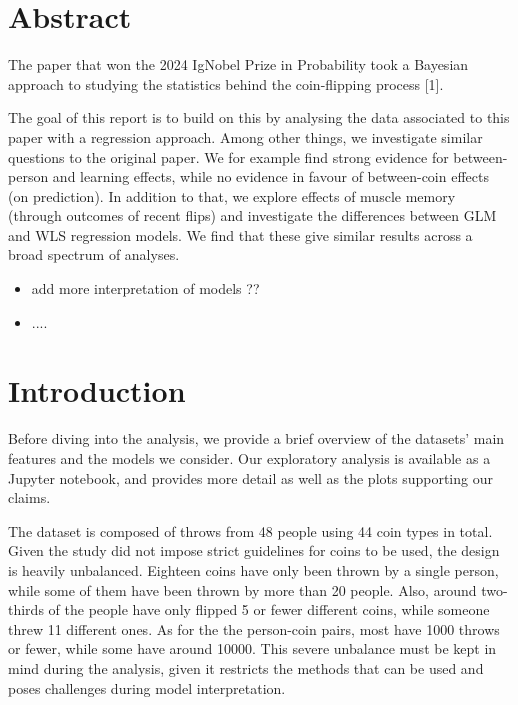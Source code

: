 \documentclass[a4paper, 12pt,oneside]{article}
\begin{document}
 
	 
	\clearpage
	\tableofcontents
	\thispagestyle{empty}
	\vspace{2cm}
	\section*{Abstract}
		The paper that won the 2024 IgNobel Prize in Probability took a Bayesian approach to studying the statistics behind the coin-flipping process [1]. 

		The goal of this report is to build on this by analysing the data associated to this paper with a regression approach. Among other things, we investigate similar questions to the original paper. We for example find strong evidence for between-person and learning effects, while no evidence in favour of between-coin effects (on prediction). In addition to that, we explore effects of muscle memory (through outcomes of recent flips) and investigate the differences between GLM and WLS regression models. We find that these give similar results across a broad spectrum of analyses. 
		\begin{itemize}
			\item add more interpretation of models ?? 
			\item ....
		\end{itemize}
	\clearpage
	\setcounter{page}{1}
	\section{Introduction}
		Before diving into the analysis, we provide a brief overview of the datasets' main features and the models we consider. Our exploratory analysis is available as a Jupyter notebook, and provides more detail as well as the plots supporting our claims.

		The dataset is composed of throws from 48 people using 44 coin types in total. Given the study did not impose strict guidelines for coins to be used, the design is heavily unbalanced. Eighteen coins have only been thrown by a single person, while some of them have been thrown by more than 20 people. Also, around two-thirds of the people have only flipped 5 or fewer different coins, while someone threw 11 different ones. As for the the person-coin pairs, most have 1000 throws or fewer, while some have around 10000. This severe unbalance must be kept in mind during the analysis, given it restricts the methods that can be used and poses challenges during model interpretation. 
\end{document}
